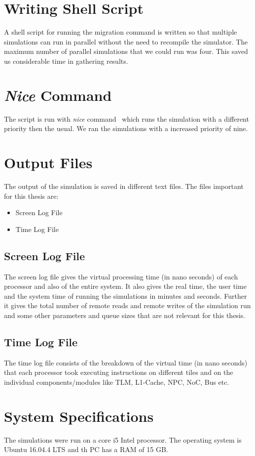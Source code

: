 \documentclass{listhesis}
\begin{document}
\section{Writing Shell Script}
A shell script for running the migration command is written so that multiple simulations can run in parallel without the need to recompile the simulator. The maximum number of parallel simulations that we could run was four. This saved us considerable time in gathering results. 
\section{\textit{Nice} Command}
The script is run with \textit{nice} command~\cite{nice} which runs the simulation with a different priority then the usual. We ran the simulations with a increased priority of nine.
\section{Output Files}
The output of the simulation is saved in different text files. The files important for this thesis are:
\begin{itemize}
\item Screen Log File
\item Time Log File
\end{itemize}
\subsection{Screen Log File}
The screen log file gives the virtual processing time (in nano seconds) of each processor and also of the entire system. It also gives the real time, the user time and the system time of running the simulations in minutes and seconds. Further it gives the total number of remote reads and remote writes of the simulation run and some other parameters and queue sizes that are not relevant for this thesis.\\
\subsection{Time Log File}
The time log file consists of the breakdown of the virtual time (in nano seconds) that each processor took executing instructions on different tiles and on the individual components/modules like TLM, L1-Cache, NPC, NoC, Bus etc.
\section{System Specifications}
The simulations were run on a core i5 Intel processor. The operating system is Ubuntu 16.04.4 LTS and th PC has a RAM of 15 GB.
\end{document}
